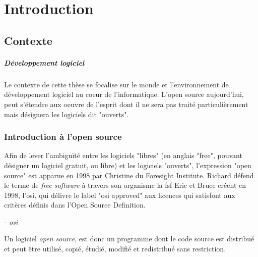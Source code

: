 \chapter{Introduction}

	\section{Contexte}

		\paragraph{Développement logiciel \\}
		
			Le contexte de cette thèse se focalise sur le monde et l'environnement de développement logiciel au coeur de l'informatique. L'\Gls{open source} aujourd'hui, peut s'étendre aux oeuvre de l'esprit dont il ne sera pas traité particulièrement mais désignera les logiciels dit "ouverts".
		
		\subsection{Introduction à l'open source}

			Afin de lever l'ambiguïté entre les logiciels "libres" (en anglais "free", pouvant désigner un logiciel gratuit, ou libre) et les logiciels "ouverts", l'expression "\gls{open source}" est apparue en 1998 par Christine  du Foresight Institute.
			Richard  défend le terme de \textit{free software} à travers son organisme la \acrfull{fsf}
			Eric  et Bruce  créent en 1998, l'\acrfull{osi}, qui délivre le label "\acrshort{osi} approved" aux licences qui satisfont aux critères définis dans l'Open Source Definition.

			\begin{center}
				\textit{
				 - \acrshort{osi}
				}
			\end{center}

			Un logiciel \textit{open source}, est donc un programme dont le code source est distribué et peut être utilisé, copié, étudié, modifié et redistribué sans restriction.

